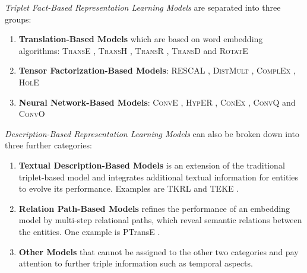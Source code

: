 \textit{Triplet Fact-Based Representation Learning Models} are separated into three groups:
\begin{enumerate}
    \item 
    \textbf{Translation-Based Models}  which are based on word embedding algorithms: 
    \textsc{TransE} \cite{TransE}, \textsc{TransH} \cite{TransH}, \textsc{TransR} \cite{TransR}, \textsc{TransD} \cite{TransD}
    and 
    \textsc{RotatE} \cite{RotatE}
    
    \item 
    \textbf{Tensor Factorization-Based Models}:
    \textsc{RESCAL} \cite{RESCAL}, \textsc{DistMult} \cite{DistMult}, \textsc{ComplEx} \cite{ComplEx}, \textsc{HolE} \cite{HolE}
    
    \item 
    \textbf{Neural Network-Based Models}:
    \textsc{ConvE} \cite{ConvE}, \textsc{HypER} \cite{HypER}, \textsc{ConEx} \cite{ConEx}, \textsc{ConvQ} and  \textsc{ConvO} \cite{demir2021convolutional}
\end{enumerate}
\textit{Description-Based Representation Learning Models} can also be broken down into three further categories:
\begin{enumerate}
    \item 
    \textbf{Textual Description-Based Models} is an extension of the traditional triplet-based model and integrates additional textual information for entities to evolve its performance.
    Examples are \ac{TKRL} \cite{TKRL} and \ac{TEKE} \cite{TEKE}.
    
    \item 
    \textbf{Relation Path-Based Models} refines the performance of an embedding model by multi-step relational paths, which reveal semantic relations between the entities.
    One example is \ac{PTransE} \cite{PTransE}.
    
     \item 
    \textbf{Other Models} that cannot be assigned to the other two categories and pay attention to further triple information such as temporal aspects.
\end{enumerate}


